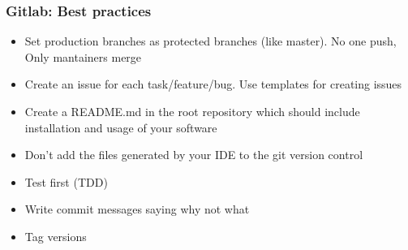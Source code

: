\begin{frame}

\frametitle{Gitlab: Best practices}

\begin{itemize}[<+->]
\item Set production branches as protected branches (like master). No one push, Only mantainers merge
\item Create an issue for each task/feature/bug. Use templates for creating issues
\item Create a README.md in the root repository which should include installation and usage of your software
\item Don't add the files generated by your IDE to the git version control
\item Test first (TDD)
\item Write commit messages saying why not what
\item Tag versions
\end{itemize}

\end{frame}